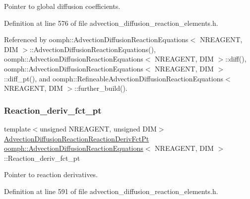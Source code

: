 Pointer to global diffusion coefficients. 



Definition at line 576 of file advection\+\_\+diffusion\+\_\+reaction\+\_\+elements.\+h.



Referenced by oomph\+::\+Advection\+Diffusion\+Reaction\+Equations$<$ N\+R\+E\+A\+G\+E\+N\+T, D\+I\+M $>$\+::\+Advection\+Diffusion\+Reaction\+Equations(), oomph\+::\+Advection\+Diffusion\+Reaction\+Equations$<$ N\+R\+E\+A\+G\+E\+N\+T, D\+I\+M $>$\+::diff(), oomph\+::\+Advection\+Diffusion\+Reaction\+Equations$<$ N\+R\+E\+A\+G\+E\+N\+T, D\+I\+M $>$\+::diff\+\_\+pt(), and oomph\+::\+Refineable\+Advection\+Diffusion\+Reaction\+Equations$<$ N\+R\+E\+A\+G\+E\+N\+T, D\+I\+M $>$\+::further\+\_\+build().

\mbox{\label{classoomph_1_1AdvectionDiffusionReactionEquations_a2544062d28d4f81014474ca9e47fa2ac}} 
\subsubsection{\texorpdfstring{Reaction\+\_\+deriv\+\_\+fct\+\_\+pt}{Reaction\_deriv\_fct\_pt}}
{\footnotesize\ttfamily template$<$unsigned N\+R\+E\+A\+G\+E\+NT, unsigned D\+IM$>$ \\
\hyperlink{classoomph_1_1AdvectionDiffusionReactionEquations_af7afb472439d8e83b825c0a3c03190a7}{Advection\+Diffusion\+Reaction\+Reaction\+Deriv\+Fct\+Pt} \hyperlink{classoomph_1_1AdvectionDiffusionReactionEquations}{oomph\+::\+Advection\+Diffusion\+Reaction\+Equations}$<$ N\+R\+E\+A\+G\+E\+NT, D\+IM $>$\+::Reaction\+\_\+deriv\+\_\+fct\+\_\+pt\hspace{0.3cm}{\ttfamily [protected]}}



Pointer to reaction derivatives. 



Definition at line 591 of file advection\+\_\+diffusion\+\_\+reaction\+\_\+elements.\+h.



